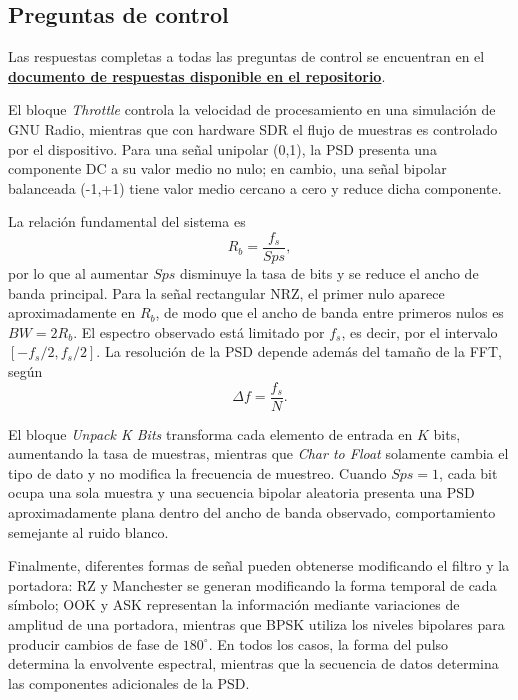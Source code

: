 \documentclass[twocolumn]{IEEEtran}
\begin{document}
\subsection*{Preguntas de control}

Las respuestas completas a todas las preguntas de control se encuentran en el
\href{https://github.com/J202R/2026_2_ComII_A1_A1E/blob/8561d6605cb175f4b1f52bd0fa1fc54990ee867e/Pr%C3%A1ctica_2/respuestas%20a%20preguntas/preguntas.pdf}
{\textbf{documento de respuestas disponible en el repositorio}}.




El bloque \textit{Throttle} controla la velocidad de procesamiento en una simulación de GNU Radio, mientras que con hardware SDR el flujo de muestras es controlado por el dispositivo. Para una señal unipolar (0,1), la PSD presenta una componente DC  a su valor medio no nulo; en cambio, una señal bipolar balanceada (-1,+1) tiene valor medio cercano a cero y reduce dicha componente.

La relación fundamental del sistema es
\[
R_b=\frac{f_s}{Sps},
\]
por lo que al aumentar \(Sps\) disminuye la tasa de bits y se reduce el ancho de banda principal. Para la señal rectangular NRZ, el primer nulo aparece aproximadamente en \(R_b\), de modo que el ancho de banda entre primeros nulos es \(BW=2R_b\). El espectro observado está limitado por \(f_s\), es decir, por el intervalo \([-f_s/2,f_s/2]\). La resolución de la PSD depende además del tamaño de la FFT, según
\[
\Delta f=\frac{f_s}{N}.
\]

El bloque \textit{Unpack K Bits} transforma cada elemento de entrada en \(K\) bits, aumentando la tasa de muestras, mientras que \textit{Char to Float} solamente cambia el tipo de dato y no modifica la frecuencia de muestreo. Cuando \(Sps=1\), cada bit ocupa una sola muestra y una secuencia bipolar aleatoria presenta una PSD aproximadamente plana dentro del ancho de banda observado, comportamiento semejante al ruido blanco.

Finalmente, diferentes formas de señal pueden obtenerse modificando el filtro y la portadora: RZ y Manchester se generan modificando la forma temporal de cada símbolo; OOK y ASK representan la información mediante variaciones de amplitud de una portadora, mientras que BPSK utiliza los niveles bipolares para producir cambios de fase de \(180^\circ\). En todos los casos, la forma del pulso determina la envolvente espectral, mientras que la secuencia de datos determina las componentes adicionales de la PSD.
\end{document}

